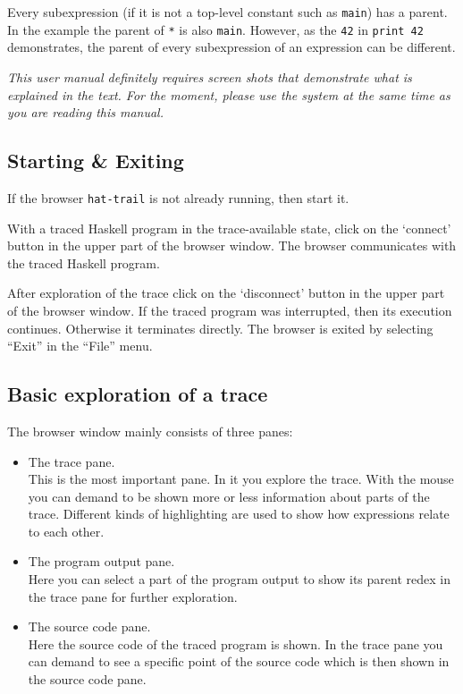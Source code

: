 \documentclass[12pt]{article}
\begin{document}
Every subexpression (if it is not a top-level constant such as \texttt{main}) has a parent. In the example the parent of \texttt{*} is also \texttt{main}. However, as the \texttt{42} in \texttt{print 42} demonstrates, the parent of every subexpression of an expression can be different.

\emph{This user manual definitely requires screen shots that demonstrate what is explained in the text. For the moment, please use the system at the same time as you are reading this manual.}


\subsection{Starting \& Exiting}

If the browser \texttt{hat-trail} is not already running, then start it.

With a traced Haskell program in the trace-available
state, click on the `connect' button in the upper part
of the browser window.  
The browser communicates with the traced Haskell program.

After exploration of the trace click on the `disconnect' button in the upper part of the browser window. If the traced program was interrupted, then its execution continues. Otherwise it terminates directly.
The browser is exited by selecting ``Exit'' in the ``File'' menu.

\subsection{Basic exploration of a trace}

The browser window mainly consists of three panes:

\begin{itemize}
\item The trace pane. \\
This is the most important pane. In it you explore the trace. With the mouse you can demand to be shown more or less information about parts of the trace. Different kinds of highlighting are used to show how expressions relate to each other.

\item The program output pane. \\
Here you can select a part of the program output to show its parent redex in the trace pane for further exploration.

\item The source code pane. \\
Here the source code of the traced program is shown. In the trace pane you can demand to see a specific point of the source code which is then shown in the source code pane.
\end{itemize}
\end{document}
